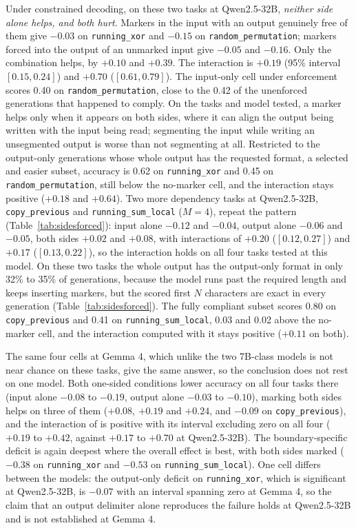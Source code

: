 \documentclass[10pt]{article} %
\newcommand{\task}[1]{\texttt{#1}}
\begin{document}
Under constrained decoding, on these two tasks at Qwen2.5-32B, \emph{neither side alone helps, and both hurt}. Markers in the input
with an output genuinely free of them give $-0.03$ on \task{running\_xor} and $-0.15$ on
\task{random\_permutation}; markers forced into the output of an unmarked input give $-0.05$ and
$-0.16$. Only the combination helps, by $+0.10$ and $+0.39$. The interaction is $+0.19$ (95\%
interval $[0.15, 0.24]$) and $+0.70$ ($[0.61, 0.79]$). The input-only cell under enforcement scores 0.40 on \task{random\_permutation}, close to
the 0.42 of the unenforced generations that happened to comply. On the tasks and model tested, a marker helps only when it appears on both sides, where it can align the output being written with the input being read; segmenting the input while writing an unsegmented output is worse than not segmenting at all. Restricted to the output-only generations whose whole output has the requested format, a selected and easier subset, accuracy is 0.62 on \task{running\_xor} and 0.45 on \task{random\_permutation}, still below the no-marker cell, and the interaction stays positive ($+0.18$ and $+0.64$). Two more dependency tasks at Qwen2.5-32B, \task{copy\_previous} and \task{running\_sum\_local} ($M = 4$), repeat the pattern (Table~\ref{tab:sidesforced}): input alone $-0.12$ and $-0.04$, output alone $-0.06$ and $-0.05$, both sides $+0.02$ and $+0.08$, with interactions of $+0.20$ ($[0.12, 0.27]$) and $+0.17$ ($[0.13, 0.22]$), so the interaction holds on all four tasks tested at this model. On these two tasks the whole output has the output-only format in only 32\% to 35\% of generations, because the model runs past the required length and keeps inserting markers, but the scored first $N$ characters are exact in every generation (Table~\ref{tab:sidesforced}). The fully compliant subset scores 0.80 on \task{copy\_previous} and 0.41 on \task{running\_sum\_local}, 0.03 and 0.02 above the no-marker cell, and the interaction computed with it stays positive ($+0.11$ on both).

The same four cells at Gemma 4, which unlike the two 7B-class models is not near chance on these tasks, give the same answer, so the conclusion does not rest on one model. Both one-sided conditions lower accuracy on all four tasks there (input alone $-0.08$ to $-0.19$, output alone $-0.03$ to $-0.10$), marking both sides helps on three of them ($+0.08$, $+0.19$ and $+0.24$, and $-0.09$ on \task{copy\_previous}), and the interaction of  is positive with its interval excluding zero on all four ($+0.19$ to $+0.42$, against $+0.17$ to $+0.70$ at Qwen2.5-32B). The boundary-specific deficit is again deepest where the overall effect is best, with both sides marked ($-0.38$ on \task{running\_xor} and $-0.53$ on \task{running\_sum\_local}). One cell differs between the models: the output-only deficit on \task{running\_xor}, which is significant at Qwen2.5-32B, is $-0.07$ with an interval spanning zero at Gemma 4, so the claim that an output delimiter alone reproduces the failure holds at Qwen2.5-32B and is not established at Gemma 4.
\end{document}
